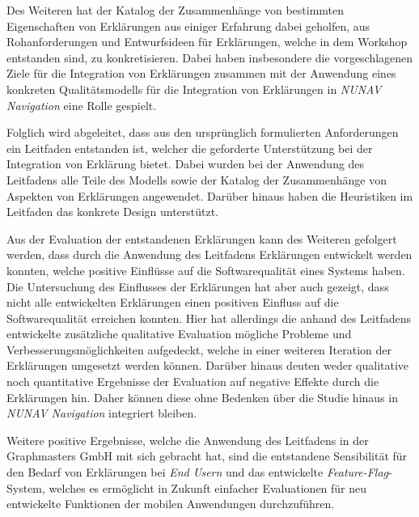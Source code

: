 Des Weiteren hat der Katalog der Zusammenhänge von bestimmten Eigenschaften von Erklärungen aus einiger Erfahrung dabei geholfen, aus Rohanforderungen und Entwurfsideen für Erklärungen, welche in dem Workshop entstanden sind, zu konkretisieren. Dabei haben insbesondere die vorgeschlagenen Ziele für die Integration von Erklärungen zusammen mit der Anwendung eines konkreten Qualitätsmodells für die Integration von Erklärungen in \textit{NUNAV Navigation} eine Rolle gespielt.

Folglich wird abgeleitet, dass aus den ursprünglich formulierten Anforderungen ein Leitfaden entstanden ist, welcher die geforderte Unterstützung bei der Integration von Erklärung bietet. Dabei wurden bei der Anwendung des Leitfadens alle Teile des Modells sowie der Katalog der Zusammenhänge von Aspekten von Erklärungen angewendet. Darüber hinaus haben die Heuristiken im Leitfaden das konkrete Design unterstützt.


Aus der Evaluation der entstandenen Erklärungen kann des Weiteren gefolgert werden, dass durch die Anwendung des Leitfadens Erklärungen entwickelt werden konnten, welche positive Einflüsse auf die Softwarequalität eines Systems haben. Die Untersuchung des Einflusses der Erklärungen hat aber auch gezeigt, dass nicht alle entwickelten Erklärungen einen positiven Einfluss auf die Softwarequalität erreichen konnten. Hier hat allerdings die anhand des Leitfadens entwickelte zusätzliche qualitative Evaluation mögliche Probleme und Verbesserungsmöglichkeiten aufgedeckt, welche in einer weiteren Iteration der Erklärungen umgesetzt werden können. Darüber hinaus deuten weder qualitative noch quantitative Ergebnisse der Evaluation auf negative Effekte durch die Erklärungen hin. Daher können diese ohne Bedenken über die Studie hinaus in \textit{NUNAV Navigation} integriert bleiben.

Weitere positive Ergebnisse, welche die Anwendung des Leitfadens in der Graphmasters GmbH mit sich gebracht hat, sind die entstandene Sensibilität für den Bedarf von Erklärungen bei \textit{End Usern} und das entwickelte \textit{Feature-Flag}-System, welches es ermöglicht in Zukunft einfacher Evaluationen für neu entwickelte Funktionen der mobilen Anwendungen durchzuführen.



